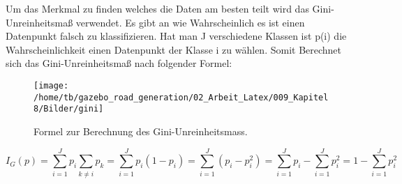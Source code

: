 Um das Merkmal zu finden welches die Daten am besten teilt wird das Gini-Unreinheitsma{\ss} verwendet. Es gibt an wie Wahrscheinlich es ist einen Datenpunkt falsch zu klassifizieren.
Hat man J verschiedene Klassen ist  p(i) die Wahrscheinlichkeit einen Datenpunkt der Klasse i zu w{\"a}hlen. Somit Berechnet sich das Gini-Unreinheitsma{\ss} nach folgender Formel:

\begin{figure}[H]
\begin{center}
  \texttt{[image: /home/tb/gazebo\_road\_generation/02\_Arbeit\_Latex/009\_Kapitel8/Bilder/gini]}%
  \caption[Formel zur Berechnung des Gini-Unreinheitsmass]%
           {\label{fig:Formel zur Berechnung des Gini-Unreinheitsmass}%
           Formel zur Berechnung des Gini-Unreinheitsmass.
           }
\end{center}
\end{figure}
  
$$ I_{G}(p)  = \sum_{i=1}^{J} p_{i} \sum_{k \neq i} p_{k} = \sum_{i=1}^{J} p_{i}(1-p_{i}) = \sum_{i=1}^{J} (p_{i} - p_{i}^2) = \sum_{i=1}^{J} p_{i} - \sum_{i=1}^{J} p_{i}^2 = 1 - \sum_{i=1}^{J} p_{i}^2 $$

